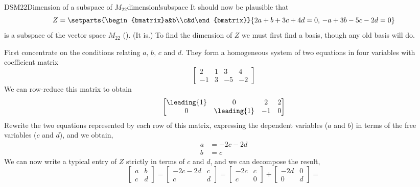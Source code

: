 %
\begin{example}{DSM22}{Dimension of a subspace of $M_{22}$}{dimension!subspace}
It should now be plausible that
%
\begin{equation*}
Z=\setparts{\begin{bmatrix}a&b\\c&d\end{bmatrix}}{2a+b+3c+4d=0,\,-a+3b-5c-2d=0}
\end{equation*}
%
is a subspace of the vector space $M_{22}$ ().  (It is.)  To find the dimension of $Z$ we must first find a basis, though any old basis will do.\par
%
First concentrate on the conditions relating $a,\,b,\,c$ and $d$.  They form a homogeneous system of two equations in four variables with coefficient matrix
%
\begin{equation*}
\begin{bmatrix}
2 & 1 & 3 & 4\\
-1 & 3 & -5 & -2
\end{bmatrix}
\end{equation*}
%
We can row-reduce this matrix to obtain
%
\begin{equation*}
\begin{bmatrix}
\leading{1} & 0 & 2 & 2\\
0 & \leading{1} & -1 & 0
\end{bmatrix}
\end{equation*}
%
Rewrite the two equations represented by each row of this matrix, expressing the dependent variables ($a$ and $b$) in terms of the free variables ($c$ and $d$), and we obtain,
%
\begin{align*}
a&=-2c-2d\\
b&=c
\end{align*}
%
We can now write a typical entry of $Z$ strictly in terms of $c$ and $d$, and we can decompose the result,
%
\begin{equation*}
\begin{bmatrix}a&b\\c&d\end{bmatrix}=
\begin{bmatrix}-2c-2d&c\\c&d\end{bmatrix}=
%
\begin{bmatrix}-2c&c\\c&0\end{bmatrix}+
\begin{bmatrix}-2d&0\\0&d\end{bmatrix}=

\end{equation*}
\end{example}
